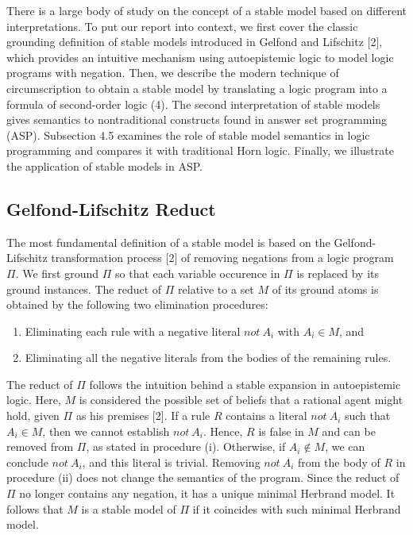 There is a large body 
of study on the concept of a stable model based on different interpretations. To put our report into 
context, we first cover the classic grounding definition of stable models introduced in Gelfond and Lifschitz [2], 
which provides an intuitive mechanism using autoepistemic logic to model logic programs with negation. 
Then, we describe the modern  
technique of circumscription to obtain a stable model by translating a logic program 
into a formula of second-order logic (4). The second interpretation of stable models gives semantics 
to nontraditional constructs found in answer set programming (ASP). Subsection 4.5 examines the role of 
stable model semantics in logic programming and compares it with traditional Horn logic. Finally, 
we illustrate the application of stable models in ASP. 

\subsection{Gelfond-Lifschitz Reduct}
The most fundamental definition of a stable model is based on the Gelfond-Lifschitz transformation 
process [2] of removing negations from a logic program $\Pi$. 
We first ground $\Pi$ so that each variable occurence in $\Pi$ is replaced by its ground instances. 
The reduct of $\Pi$ relative to a set $M$ of its ground atoms is obtained by the following two 
elimination procedures:
\begin{enumerate}[label=(\roman*)]
    \item Eliminating each rule with a negative literal $not \: A_i$ with $A_i \in M$, and 
    \item Eliminating all the negative literals from the bodies of the remaining rules.
\end{enumerate}
The reduct of $\Pi$ follows the intuition behind a stable expansion in 
autoepistemic logic. Here, $M$ is considered the possible set of beliefs that a rational 
agent might hold, given $\Pi$ as his premises [2]. If a rule $R$ contains a literal $not \: A_i$ 
such that $A_i \in M$, then we cannot establish $not \: A_i$. Hence, $R$ is false in $M$ and can be 
removed from $\Pi$, as stated in procedure (i). Otherwise, if $A_i \not \in M$, we can conclude 
$not \: A_i$, and this literal is trivial. Removing $not \: A_i$ from the body of $R$ in 
procedure (ii) does not change the semantics of the program. Since the reduct of $\Pi$ no longer 
contains any negation, it has a unique minimal Herbrand model.  
It follows that $M$ is a stable model of $\Pi$ if it coincides with such minimal Herbrand model.

